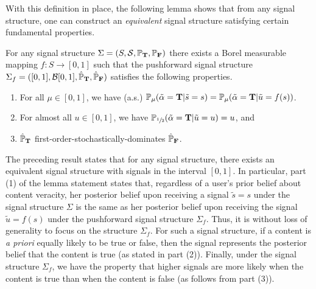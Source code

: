 With this definition in place, the following lemma shows that from any signal structure, one can construct an {\em equivalent} signal structure satisfying certain fundamental properties. 
\begin{lemma}\label{lem:sign_equiv}
  For any signal structure $\Sigma = (S, \mathcal{S}, \mathbb{P}_{\mathbf{T}}, \mathbb{P}_{\mathbf{F}})$  there exists a Borel measurable mapping $f : S \to [0,1]$ such that the pushforward signal structure  $\Sigma_f = ([0,1], \mathcal{B}[0,1], \hat{\mathbb{P}}_{\mathbf{T}}, \hat{\mathbb{P}}_{\mathbf{F}})$ satisfies the following properties. 
  \begin{enumerate}
    \item For all $\mu \in [0,1]$, we have (a.s.) $\mathbb{P}_\mu(\tilde{\alpha} = \mathbf{T} | \tilde{s} = s) = \mathbb{P}_\mu ( \tilde{\alpha} = \mathbf{T} | \tilde{u} = f(s))$.
      \item For almost all $u \in [0,1]$, we have $\mathbb{P}_{\sfrac{1}{2}} (\tilde{\alpha} = \mathbf{T} |\tilde{u}=u)=u$, and
      \item $\hat{\mathbb{P}}_{\mathbf{T}}$ first-order-stochastically-dominates $\hat{\mathbb{P}}_{\mathbf{F}}$.
  \end{enumerate}
\end{lemma}
The preceding result states that for any signal structure, there exists an equivalent signal structure with signals in the interval $[0,1]$. In particular, part (1) of the lemma statement states that, regardless of a user's prior belief about content veracity, her posterior belief upon receiving a signal $\tilde{s} = s$ under the signal structure $\Sigma$ is the same as her posterior belief upon receiving the signal $\tilde{u} = f(s)$ under the pushforward signal structure $\Sigma_f$. Thus, it is without loss of generality to focus on the structure $\Sigma_f$. For such a signal structure, if a content is {\em a priori} equally likely to be true or false, then the signal represents the posterior belief that the content is true (as stated in part (2)).  Finally, under the signal structure $\Sigma_f$, we have the property that higher signals are more likely when the content is true than when the content is false (as follows from part (3)). 

